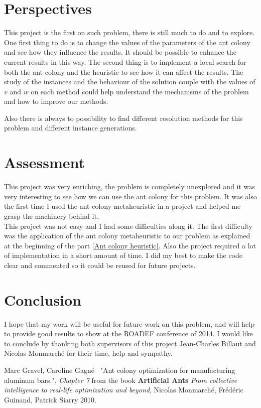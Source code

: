 \documentclass[UTF8, twoside]{EPURapport}
\begin{document}
\chapter{Perspectives}

	\hspace{4ex}This project is the first on such problem, there is still much to do and to explore. One first thing to do is to change the values of the parameters of the ant colony and see how they influence the results. It should be possible to enhance the current results in this way. The second thing is to implement a local search for both the ant colony and the heuristic to see how it can affect the results. The study of the instances and the behaviour of the solution couple with the values of $v$ and $w$ on each method could help understand the mechanisms of the problem and how to improve our methods.
	
	Also there is always to possibility to find different resolution methods for this problem and different instance generations.

\chapter{Assessment}

	\hspace{4ex}This project was very enriching, the problem is completely unexplored and it was very interesting to see how we can use the ant colony for this problem. It was also the first time I used the ant colony metaheuristic in a project and helped me grasp the machinery behind it.
\\

	This project was not easy and I had some difficulties along it. The first difficulty was the application of the ant colony metaheuristic to our problem as explained at the beginning of the part \ref{Ant colony heuristic}. Also the project required a lot of implementation in a short amount of time. I did my best to make the code clear and commented so it could be reused for future projects.

\chapter{Conclusion}

	\hspace{4ex}I hope that my work will be useful for future work on this problem, and will help to provide good results to show at the ROADEF conference of 2014. I would like to conclude by thanking both supervisors of this project Jean-Charles Billaut and Nicolas Monmarché for their time, help and sympathy.

\begin{thebibliography}{99}

{\sc Marc Gravel, Caroline Gagné}
{\ "Ant colony optimization for manufacturing aluminum bars."}.
{ \textit{Chapter 7} from the book \textbf{Artificial Ants} \textit{From collective intelligence to real-life optimization and beyond}, Nicolas Monmarché, Frédéric Guinand, Patrick Siarry 2010}.

\end{thebibliography}
\end{document}
